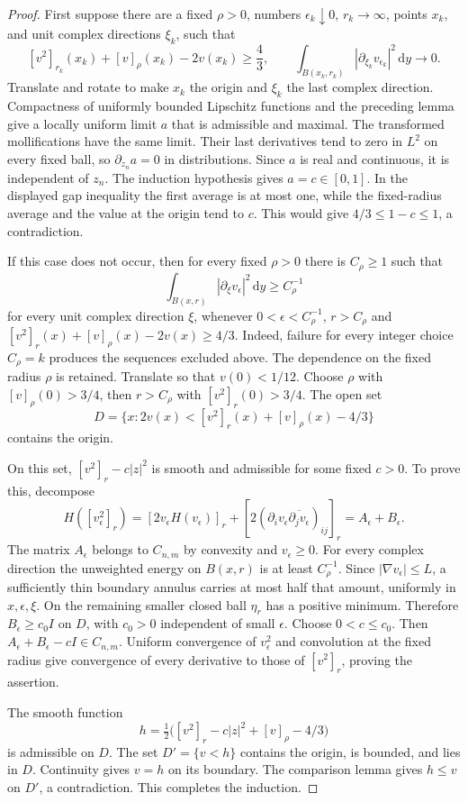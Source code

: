 \begin{proof}
First suppose there are a fixed $\rho>0$, numbers $\epsilon_k\downarrow0$, $r_k\to\infty$, points $x_k$, and unit complex directions $\xi_k$, such that
\[
 [v^2]_{r_k}(x_k)+[v]_\rho(x_k)-2v(x_k)\geq\frac43,
 \qquad
 \int_{B(x_k,r_k)}|\partial_{\xi_k}v_{\epsilon_k}|^2\,\mathrm dy\longrightarrow0.
\]
Translate and rotate to make $x_k$ the origin and $\xi_k$ the last complex direction. Compactness of uniformly bounded Lipschitz functions and the preceding lemma give a locally uniform limit $a$ that is admissible and maximal. The transformed mollifications have the same limit. Their last derivatives tend to zero in $L^2$ on every fixed ball, so $\partial_{z_n}a=0$ in distributions. Since $a$ is real and continuous, it is independent of $z_n$.
The induction hypothesis gives $a=c\in[0,1]$. In the displayed gap inequality the first average is at most one, while the fixed-radius average and the value at the origin tend to $c$. This would give $4/3\leq1-c\leq1$, a contradiction.

If this case does not occur, then for every fixed $\rho>0$ there is $C_\rho\geq1$ such that
\[
 \int_{B(x,r)}|\partial_\xi v_\epsilon|^2\,\mathrm dy\geq C_\rho^{-1}
\]
for every unit complex direction $\xi$, whenever $0<\epsilon<C_\rho^{-1}$, $r>C_\rho$ and
$[v^2]_r(x)+[v]_\rho(x)-2v(x)\geq4/3$.
Indeed, failure for every integer choice $C_\rho=k$ produces the sequences excluded above. The dependence on the fixed radius $\rho$ is retained.
Translate so that $v(0)<1/12$. Choose $\rho$ with $[v]_\rho(0)>3/4$, then $r>C_\rho$ with $[v^2]_r(0)>3/4$. The open set
\[
 D=\{x:2v(x)<[v^2]_r(x)+[v]_\rho(x)-4/3\}
\]
contains the origin.

On this set, $[v^2]_r-c|z|^2$ is smooth and admissible for some fixed $c>0$. To prove this, decompose
\[
 H([v_\epsilon^2]_r)
 = [2v_\epsilon H(v_\epsilon)]_r
   +[2(\partial_i v_\epsilon\overline{\partial_jv_\epsilon})_{ij}]_r
 =A_\epsilon+B_\epsilon.
\]
The matrix $A_\epsilon$ belongs to $C_{n,m}$ by convexity and $v_\epsilon\geq0$.
For every complex direction the unweighted energy on $B(x,r)$ is at least $C_\rho^{-1}$. Since $|\nabla v_\epsilon|\leq L$, a sufficiently thin boundary annulus carries at most half that amount, uniformly in $x,\epsilon,\xi$. On the remaining smaller closed ball $\eta_r$ has a positive minimum. Therefore $B_\epsilon\geq c_0I$ on $D$, with $c_0>0$ independent of small $\epsilon$.
Choose $0<c\leq c_0$. Then $A_\epsilon+B_\epsilon-cI\in C_{n,m}$. Uniform convergence of $v_\epsilon^2$ and convolution at the fixed radius give convergence of every derivative to those of $[v^2]_r$, proving the assertion.

The smooth function
\[
 h=\tfrac12\bigl([v^2]_r-c|z|^2+[v]_\rho-4/3\bigr)
\]
is admissible on $D$. The set $D'=\{v<h\}$ contains the origin, is bounded, and lies in $D$. Continuity gives $v=h$ on its boundary. The comparison lemma gives $h\leq v$ on $D'$, a contradiction. This completes the induction.
\end{proof}

